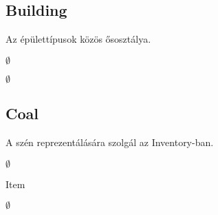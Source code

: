 \subsection{Building}
\begin{class-template-responsibility}
Az épülettípusok közös ősosztálya. 
\end{class-template-responsibility}
\begin{class-template-interface}
$\emptyset$
\end{class-template-interface}
\begin{class-template-baseclass}
$\emptyset$
\end{class-template-baseclass}
\begin{class-template-attribute}
\end{class-template-attribute}
\begin{class-template-method}
\end{class-template-method}


\subsection{Coal}
\begin{class-template-responsibility}
A szén reprezentálására szolgál az Inventory-ban.
\end{class-template-responsibility}
\begin{class-template-interface}
$\emptyset$
\end{class-template-interface}
\begin{class-template-baseclass}
Item
\end{class-template-baseclass}
\begin{class-template-attribute}
\item[] $\emptyset$
\end{class-template-attribute}
\begin{class-template-method}
\end{class-template-method}


